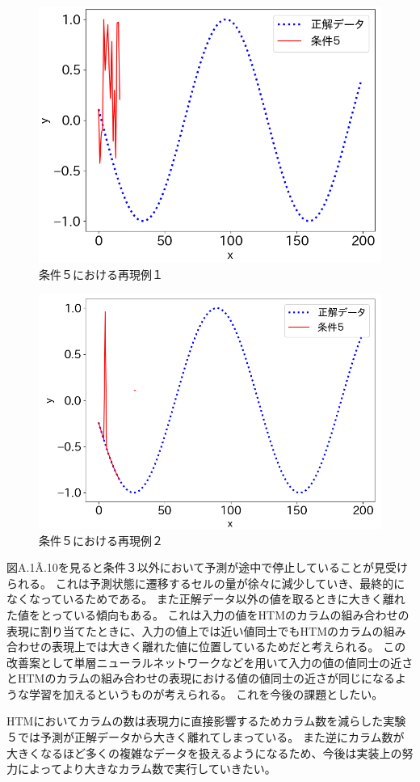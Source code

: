 \begin{figure}[hp]
  \begin{center}
    \includegraphics[width=12cm]{./fig/append9}
    \caption{条件５における再現例１}
    \label{fig:append9}
  \end{center}
\end{figure}

\begin{figure}[ht]
  \begin{center}
    \includegraphics[width=12cm]{./fig/append10}
    \caption{条件５における再現例２}
    \label{fig:append10}
  \end{center}
\end{figure}

\newpage
図A.1\~A.10を見ると条件３以外において予測が途中で停止していることが見受けられる。
これは予測状態に遷移するセルの量が徐々に減少していき、最終的になくなっているためである。
また正解データ以外の値を取るときに大きく離れた値をとっている傾向もある。
これは入力の値をHTMのカラムの組み合わせの表現に割り当てたときに、入力の値上では近い値同士でもHTMのカラムの組み合わせの表現上では大きく離れた値に位置しているためだと考えられる。
この改善案として単層ニューラルネットワークなどを用いて入力の値の値同士の近さとHTMのカラムの組み合わせの表現における値の値同士の近さが同じになるような学習を加えるというものが考えられる。
これを今後の課題としたい。

HTMにおいてカラムの数は表現力に直接影響するためカラム数を減らした実験５では予測が正解データから大きく離れてしまっている。
また逆にカラム数が大きくなるほど多くの複雑なデータを扱えるようになるため、今後は実装上の努力によってより大きなカラム数で実行していきたい。

